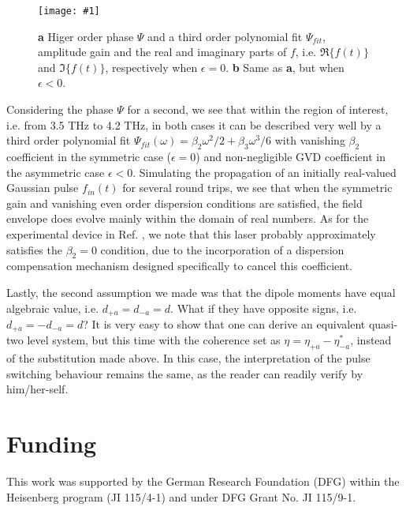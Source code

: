 \documentclass[]{spie}  %
\newcommand{\includegraphicsXL}[1]{\texttt{[image: \#1]}}
\begin{document}
\begin{appendices}
\begin{figure}[h!]
	\begin{center}
		\includegraphicsXL{IMGS/dispersion-on-off-resonance.eps}
		\caption{ \textbf{a} Higer order phase $\Psi$ and a third order polynomial fit $\Psi_{fit}$, amplitude gain  and the real and imaginary parts of $f$, i.e. $\Re\{f(t)\}$ and $\Im\{f(t)\}$, respectively when $\epsilon = 0$. \textbf{b} Same as \textbf{a}, but when $\epsilon <0$.  } \label{fig:dispersion-on-off-resonance}
	\end{center}	
\end{figure}
Considering the phase $\Psi$ for a second, we see that within the region of interest, i.e. from 3.5 THz to 4.2 THz, in both cases it can be described very well by a third order polynomial fit $\Psi_{fit}(\omega) = \beta_2\omega^2/2 + \beta_3\omega^3/6$ with vanishing $\beta_2$ coefficient in the symmetric case ($\epsilon = 0$) and non-negligible GVD coefficient in the asymmetric case $\epsilon <0$. Simulating the propagation of an initially real-valued Gaussian pulse $f_{in}(t)$ for several round trips, we see that when the symmetric gain and vanishing even order dispersion conditions are satisfied, the field envelope does evolve mainly within the domain of real numbers. As for the experimental device in Ref. , we note that this laser probably approximately satisfies the $\beta_2 = 0$ condition, due to the incorporation of a dispersion compensation mechanism designed specifically to cancel this coefficient.

Lastly, the second assumption we made was that the dipole moments have equal algebraic value, i.e. $d_{+a} = d_{-a} = d$. What if they have opposite signs, i.e. $d_{+a} = -d_{-a} = d$? It is very easy to show that one can derive an equivalent quasi-two level system, but this time with the coherence set as $\eta = \eta_{+a}-\eta_{-a}^*$, instead of the substitution made above. In this case, the interpretation of the pulse switching behaviour remains the same, as the reader can readily verify by him/her-self.

\end{appendices}

\section*{Funding}
This work was supported by the German Research Foundation (DFG) within the Heisenberg program (JI 115/4-1) and under DFG Grant No. JI 115/9-1.


\end{document}
